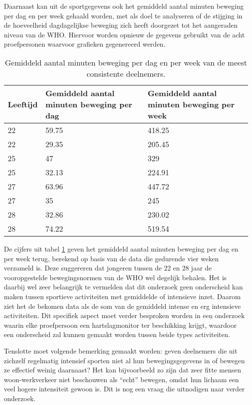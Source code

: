 Daarnaast kan uit de sportgegevens ook het gemiddeld aantal minuten beweging per dag en per week gehaald worden, met als doel te analyseren of de stijging in de hoeveelheid dagdagelijkse beweging zich heeft doorgezet tot het aangeraden niveau van de WHO. Hiervoor worden opnieuw de gegevens gebruikt van de acht proefpersonen waarvoor grafieken gegenereerd werden.

\begin{table}[h]
    \caption[Gemiddeld aantal minuten beweging per dag en per week]{Gemiddeld aantal minuten beweging per dag en per week van de meest consistente deelnemers.}
    \centering
    \label{table:gemiddeldes}
\begin{tabular}{||m{.2\linewidth} m{.4\linewidth} m{.4\linewidth}||}
    \hline
    Leeftijd & Gemiddeld aantal minuten beweging per dag & Gemiddeld aantal minuten beweging per week \\ [0.5ex]
    \hline\hline
    22 & 59.75 & 418.25 \\
    22 & 29.35 & 205.45 \\
    25 & 47 & 329 \\
    25 & 32.13 & 224.91 \\
    27 & 63.96 & 447.72 \\
    27 & 35 & 245 \\
    28 & 32.86 & 230.02 \\
    28 & 74.22 & 519.54 \\ [1ex]
    \hline
\end{tabular}
\end{table}

De cijfers uit tabel \ref{table:gemiddeldes} geven het gemiddeld aantal minuten beweging per dag en per week terug, berekend op basis van de data die gedurende vier weken verzameld is.
Deze suggereren dat jongeren tussen de 22 en 28 jaar de vooropgestelde bewegingsnormen van de WHO wel degelijk behalen.
Het is daarbij wel zeer belangrijk te vermelden dat dit onderzoek geen onderscheid kan maken tussen sportieve activiteiten met gemiddelde of intensieve inzet. Daarom ziet het de bekomen data als de som van de gemiddeld intense en erg intensieve activiteiten. Dit specifiek aspect moet verder besproken worden in een onderzoek waarin elke proefpersoon een hartslagmonitor ter beschikking krijgt, waardoor een onderscheid zal kunnen gemaakt worden tussen beide types activiteiten.

Tenslotte moet volgende bemerking gemaakt worden: geven deelnemers die uit zichzelf regelmatig intensief sporten niet al hun bewegingsgegevens in of bewegen ze effectief weinig daarnaast? Het kan bijvoorbeeld zo zijn dat zeer fitte mensen woon-werkverkeer niet beschouwen als ``echt'' bewegen, omdat hun lichaam een veel hogere intensiteit gewoon is. Dit is nog een vraag die uitnodigen naar verder onderzoek.

